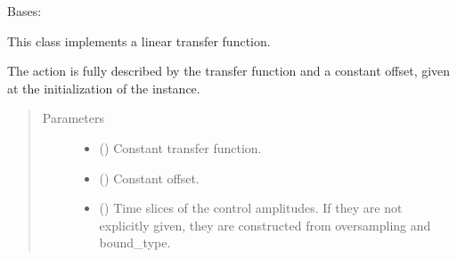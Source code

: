 \documentclass[letterpaper,10pt,english]{sphinxmanual}
\begin{document}
\begin{fulllineitems}
\label{\detokenize{qsim:qsim.transfer_function.CustomTF}}
Bases: {\hyperref[\detokenize{qsim:qsim.transfer_function.TransferFunction}]{}}

This class implements a linear transfer function.

The action is fully described by the transfer function and a constant
offset, given at the initialization of the instance.
\begin{quote}\begin{description}
\item[{Parameters}] \leavevmode\begin{itemize}
\item {} 
 (\sphinxstyleliteralemphasis{\sphinxupquote{, }}\sphinxstyleliteralemphasis{\sphinxupquote{ (}}\sphinxstyleliteralemphasis{\sphinxupquote{, }}\sphinxstyleliteralemphasis{\sphinxupquote{, }}\sphinxstyleliteralemphasis{\sphinxupquote{)}}) \textendash{} Constant transfer function.

\item {} 
 () \textendash{} Constant offset.

\item {} 
 (\sphinxstyleliteralemphasis{\sphinxupquote{, }}\sphinxstyleliteralemphasis{\sphinxupquote{ (}}\sphinxstyleliteralemphasis{\sphinxupquote{)}}) \textendash{} Time slices of the control amplitudes. If they are not explicitly
given, they are constructed from oversampling and bound\_type.


\end{itemize}
\end{description}
\end{quote}
\end{fulllineitems}
\end{document}
